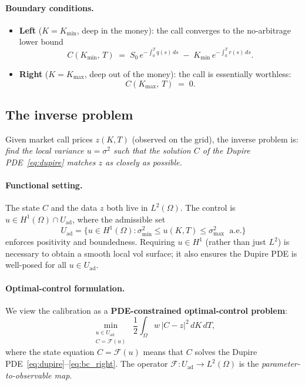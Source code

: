 \documentclass[11pt, a4paper]{article}
\newcommand{\Fop}{\mathcal{F}}          %
\newcommand{\Omg}{\Omega}
\theoremstyle{definition}
\theoremstyle{plain}
\begin{document}
\paragraph{Boundary conditions.}
\begin{itemize}
  \item \textbf{Left} ($K = K_{\min}$, deep in the money): the call
    converges to the no-arbitrage lower bound
    \begin{equation}\label{eq:bc_left}
      C(K_{\min},\, T) \;=\; S_0\,e^{-\int_0^T q(s)\,ds}
                              \;-\; K_{\min}\,e^{-\int_0^T r(s)\,ds}.
    \end{equation}
  \item \textbf{Right} ($K = K_{\max}$, deep out of the money): the call
    is essentially worthless:
    \begin{equation}\label{eq:bc_right}
      C(K_{\max},\, T) \;=\; 0.
    \end{equation}
\end{itemize}

\subsection{The inverse problem}

Given market call prices $z(K, T)$ (observed on the grid), the inverse
problem is: \emph{find the local variance $u = \sigma^2$ such that the
solution $C$ of the Dupire PDE~\eqref{eq:dupire} matches $z$ as closely as
possible.}

\paragraph{Functional setting.}
The state $C$ and the data $z$ both live in $L^2(\Omg)$.  The control is
$u \in H^1(\Omg) \cap U_\text{ad}$, where the admissible set
\begin{equation}\label{eq:Uad}
  U_\text{ad} = \bigl\{ u \in H^1(\Omg) :
    \sigma_{\min}^2 \leq u(K,T) \leq \sigma_{\max}^2
    \;\text{ a.e.}\bigr\}
\end{equation}
enforces positivity and boundedness.  Requiring $u \in H^1$ (rather than
just $L^2$) is necessary to obtain a smooth local vol surface; it also
ensures the Dupire PDE is well-posed for all $u \in U_\text{ad}$.

\paragraph{Optimal-control formulation.}
We view the calibration as a \textbf{PDE-constrained optimal-control problem}:
\begin{equation}\label{eq:oc_problem}
  \min_{\substack{u \in U_\text{ad} \\ C = \Fop(u)}}
  \;\frac{1}{2}\int_\Omg w\,|C - z|^2 \,dK\,dT,
\end{equation}
where the state equation $C = \Fop(u)$ means that $C$ solves the
Dupire PDE~\eqref{eq:dupire}--\eqref{eq:bc_right}.  The operator
$\Fop : U_\text{ad} \to L^2(\Omg)$ is the \emph{parameter-to-observable map}.
\end{document}
